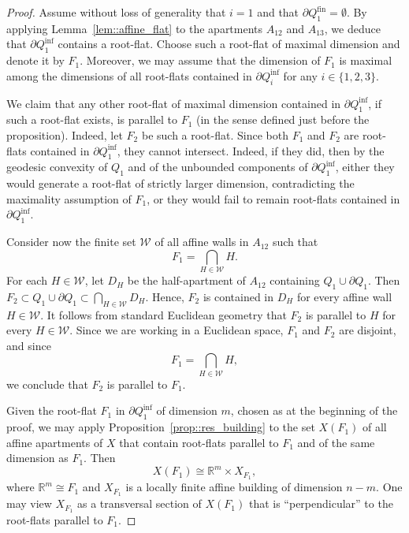\documentclass[11pt]{amsart}
\theoremstyle{plain}
\theoremstyle{definition}
\theoremstyle{remark}
\begin{document}
	
	\begin{proof}
		Assume without loss of generality that $i = 1$ and that $\partial Q_{1}^{\mathrm{fin}} = \emptyset$. By applying Lemma~\ref{lem::affine_flat} to the apartments $A_{12}$ and $A_{13}$, we deduce that $\partial Q_{1}^{\mathrm{inf}}$ contains a root-flat.  Choose such a root-flat of maximal dimension and denote it by $F_1$.  Moreover, we may assume that the dimension of $F_1$ is maximal among the dimensions of all root-flats contained in $\partial Q_{i}^{\mathrm{inf}}$ 
		for any $i \in \{1,2,3\}$.
		
We claim that any other root-flat of maximal dimension contained in \(\partial Q_{1}^{\mathrm{inf}}\), if such a root-flat exists, is parallel to \(F_1\) (in the sense defined just before the proposition). Indeed, let \(F_2\) be such a root-flat. Since both \(F_1\) and \(F_2\) are root-flats contained in \(\partial Q_{1}^{\mathrm{inf}}\), they cannot intersect. Indeed, if they did, then by the geodesic convexity of \(Q_1\) and of the unbounded components of \(\partial Q_{1}^{\mathrm{inf}}\), either they would generate a root-flat of strictly larger dimension, contradicting the maximality assumption of $F_1$, or they would fail to remain root-flats contained in \(\partial Q_{1}^{\mathrm{inf}}\). 
		
		
Consider now the finite set $\mathcal{W}$ of all affine walls in $A_{12}$ such that
\[
F_1=\bigcap_{H\in\mathcal{W}} H.
\]
For each $H\in\mathcal{W}$, let $D_H$ be the half-apartment of $A_{12}$ containing $Q_1 \cup \partial Q_1$. Then $F_2 \subset Q_1 \cup \partial Q_1 \subset \bigcap_{H\in\mathcal{W}} D_H$. Hence, $F_2$ is contained in $D_H$ for every affine wall $H\in\mathcal{W}$. It follows from standard Euclidean geometry that $F_2$ is parallel to $H$ for every $H\in\mathcal{W}$. Since we are working in a Euclidean space, $F_1$ and $F_2$ are disjoint, and since
\[
F_1=\bigcap_{H\in\mathcal{W}} H,
\]
we conclude that $F_2$ is parallel to $F_1$.
		
		
		Given the root-flat $F_1$ in $\partial Q_{1}^{\mathrm{inf}}$ of dimension $m$, chosen as at the beginning of the proof, we may apply 
		Proposition~\ref{prop::res_building} to the set $X(F_1)$ of all affine apartments of $X$ that contain root-flats parallel to $F_1$ and of the 
		same dimension as $F_1$. Then
		\[
		X(F_1) \cong \mathbb{R}^m \times X_{F_1},
		\]
		where $\mathbb{R}^m \cong F_1$ and $X_{F_1}$ is a locally finite affine building of dimension $n - m$. One may view $X_{F_1}$ as a transversal section of $X(F_1)$ that is ``perpendicular'' to the root-flats parallel to $F_1$.
		

\end{proof}
\end{document}
